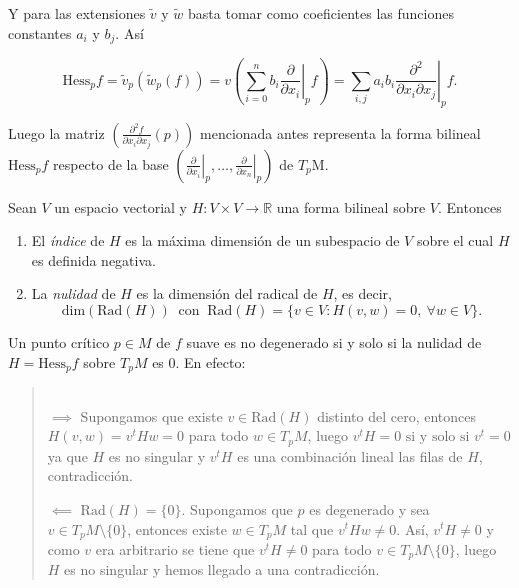 Y para las extensiones $\tilde{v}$ y $\tilde{w}$ basta tomar como coeficientes las funciones constantes $a_i$ y $b_j$. Así

\begin{equation*}
    \text{Hess}_pf= \tilde{v}_{p}(\tilde{w}_{p}(f)) = v\left(\sum_{i=0}^n b_i \left.\frac{\partial}{\partial x_i}\right|_p f\right)=\sum_{i,j} a_ib_i\left.\frac{\partial^{2}}{\partial x_i \partial x_j}\right|_p f .
\end{equation*}
\medskip

Luego la matriz $\left(\frac{\partial^{2}f}{\partial x_i \partial x_j}(p)\right)$ mencionada antes representa la forma bilineal $\text{Hess}_pf$ respecto de la base $\left( \left.\frac{\partial}{\partial x_i}\right|_p,\dots, \left.\frac{\partial}{\partial x_n}\right|_p \right)$ de $T_p\mathrm{M}$.

\vspace{3em}

\begin{definition}
    Sean $V$ un espacio vectorial y $H:V\times V\to \mathbb{R}$ una forma bilineal sobre $V$. Entonces
    
    \begin{enumerate}[label=\roman*)]
        \item El \textit{índice} de $H$ es la máxima dimensión de un subespacio de $V$ sobre el cual $H$ es definida negativa.
        
        \item La \textit{nulidad} de $H$ es la dimensión del radical de $H$, es decir,
        \begin{equation*}
            \text{dim}(\text{Rad}(H)) ~\text{ con }~ \text{Rad}(H)=\{v\in V:H(v,w)=0, ~\forall w\in V \}.
        \end{equation*}
        
    \end{enumerate}
\end{definition}


\begin{remark}
    Un punto crítico $p\in M$ de $f$ suave es no degenerado si y solo si la nulidad de $H=\text{Hess}_pf$ sobre $T_pM$ es $0$. En efecto:
    \vspace{-2em}
    \begin{quote}
        \mbox{}\\[0.5em]
        $\boxed{\implies}$ Supongamos que existe $v\in \text{Rad}(H)$ distinto del cero, entonces $H(v,w)=v^tHw=0$ para todo $w\in T_pM$, luego $v^tH=0 \text{ si y solo si } v^t = 0$ ya que $H$ es no singular y $v^tH$ es una combinación lineal las filas de $H$, contradicción.

        $\boxed{\impliedby}$ $\text{Rad}(H)=\{0\}$. Supongamos que $p$ es degenerado y sea $v\in T_pM\setminus\{0\}$, entonces existe $w\in T_pM$ tal que $v^tHw\neq 0$. Así, $v^tH\neq 0$ y como $v$ era arbitrario se tiene que $v^tH\neq 0$ para todo $v\in T_pM\setminus\{0\}$, luego $H$ es no singular y hemos llegado a una contradicción.
    \end{quote}
\end{remark}
\bigskip

